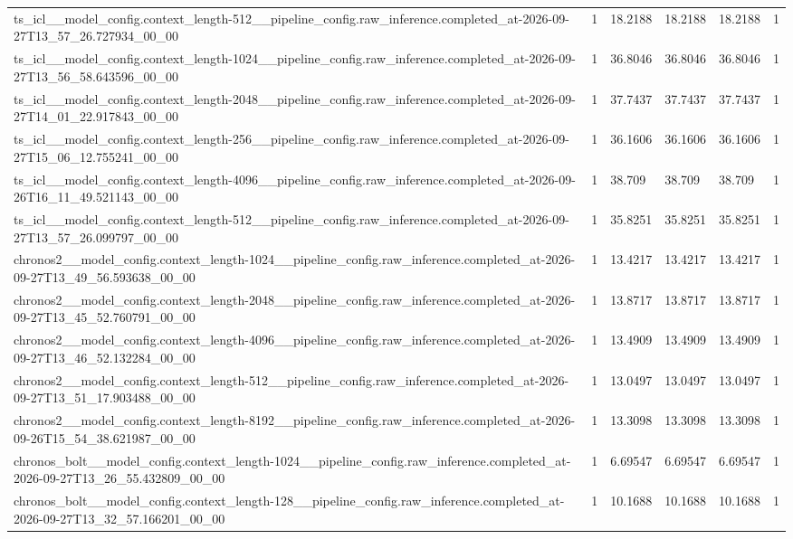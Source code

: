 \begin{tabular}{llllll}
ts\_icl\_\_model\_config.context\_length-512\_\_pipeline\_config.raw\_inference.completed\_at-2026-09-27T13\_57\_26.727934\_00\_00 & 1 & 18.2188 & 18.2188 & 18.2188 & 1 \\
ts\_icl\_\_model\_config.context\_length-1024\_\_pipeline\_config.raw\_inference.completed\_at-2026-09-27T13\_56\_58.643596\_00\_00 & 1 & 36.8046 & 36.8046 & 36.8046 & 1 \\
ts\_icl\_\_model\_config.context\_length-2048\_\_pipeline\_config.raw\_inference.completed\_at-2026-09-27T14\_01\_22.917843\_00\_00 & 1 & 37.7437 & 37.7437 & 37.7437 & 1 \\
ts\_icl\_\_model\_config.context\_length-256\_\_pipeline\_config.raw\_inference.completed\_at-2026-09-27T15\_06\_12.755241\_00\_00 & 1 & 36.1606 & 36.1606 & 36.1606 & 1 \\
ts\_icl\_\_model\_config.context\_length-4096\_\_pipeline\_config.raw\_inference.completed\_at-2026-09-26T16\_11\_49.521143\_00\_00 & 1 & 38.709 & 38.709 & 38.709 & 1 \\
ts\_icl\_\_model\_config.context\_length-512\_\_pipeline\_config.raw\_inference.completed\_at-2026-09-27T13\_57\_26.099797\_00\_00 & 1 & 35.8251 & 35.8251 & 35.8251 & 1 \\
chronos2\_\_model\_config.context\_length-1024\_\_pipeline\_config.raw\_inference.completed\_at-2026-09-27T13\_49\_56.593638\_00\_00 & 1 & 13.4217 & 13.4217 & 13.4217 & 1 \\
chronos2\_\_model\_config.context\_length-2048\_\_pipeline\_config.raw\_inference.completed\_at-2026-09-27T13\_45\_52.760791\_00\_00 & 1 & 13.8717 & 13.8717 & 13.8717 & 1 \\
chronos2\_\_model\_config.context\_length-4096\_\_pipeline\_config.raw\_inference.completed\_at-2026-09-27T13\_46\_52.132284\_00\_00 & 1 & 13.4909 & 13.4909 & 13.4909 & 1 \\
chronos2\_\_model\_config.context\_length-512\_\_pipeline\_config.raw\_inference.completed\_at-2026-09-27T13\_51\_17.903488\_00\_00 & 1 & 13.0497 & 13.0497 & 13.0497 & 1 \\
chronos2\_\_model\_config.context\_length-8192\_\_pipeline\_config.raw\_inference.completed\_at-2026-09-26T15\_54\_38.621987\_00\_00 & 1 & 13.3098 & 13.3098 & 13.3098 & 1 \\
chronos\_bolt\_\_model\_config.context\_length-1024\_\_pipeline\_config.raw\_inference.completed\_at-2026-09-27T13\_26\_55.432809\_00\_00 & 1 & 6.69547 & 6.69547 & 6.69547 & 1 \\
chronos\_bolt\_\_model\_config.context\_length-128\_\_pipeline\_config.raw\_inference.completed\_at-2026-09-27T13\_32\_57.166201\_00\_00 & 1 & 10.1688 & 10.1688 & 10.1688 & 1 \\

\end{tabular}
